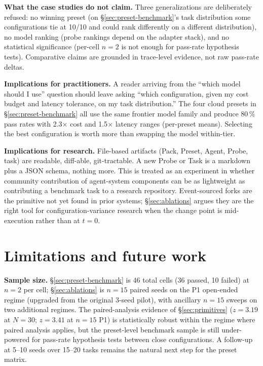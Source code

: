 \documentclass[11pt,a4paper]{article}
\begin{document}
\textbf{What the case studies do not claim.} Three
generalizations are deliberately refused: no winning preset (on
\S\ref{sec:preset-benchmark}'s task distribution some
configurations tie at 10/10 and could rank differently on a
different distribution), no model ranking (probe rankings depend
on the adapter stack), and no statistical significance (per-cell
$n = 2$ is not enough for pass-rate hypothesis tests).
Comparative claims are grounded in trace-level evidence, not raw
pass-rate deltas.

\textbf{Implications for practitioners.} A reader arriving from
the ``which model should I use'' question should leave asking
``which configuration, given my cost budget and latency tolerance,
on my task distribution.'' The four cloud presets in
\S\ref{sec:preset-benchmark} all use the same frontier model
family and produce 80\,\% pass rates with
2.3$\times$ cost and 1.5$\times$ latency ranges (per-preset means).
Selecting the best
configuration is worth more than swapping the model within-tier.

\textbf{Implications for research.} File-based artifacts
(Pack, Preset, Agent, Probe, task) are readable, diff-able,
git-tractable. A new Probe or Task is a markdown plus a JSON
schema, nothing more. This is treated as an experiment in
whether community contribution of agent-system components can be
as lightweight as contributing a benchmark task to a research
repository. Event-sourced forks are the primitive not yet
found in prior systems; \S\ref{sec:ablations} argues they are
the right tool for configuration-variance research when the
change point is mid-execution rather than at $t=0$.

\section{Limitations and future work}
\label{sec:limitations}

\textbf{Sample size.} \S\ref{sec:preset-benchmark} is 46 total
cells (36 passed, 10 failed) at $n = 2$ per cell;
\S\ref{sec:ablations} is $n=15$ paired seeds on the P1
open-ended regime (upgraded from the original 3-seed pilot),
with ancillary $n=15$ sweeps on two additional regimes. The
paired-analysis evidence of \S\ref{sec:primitives}
($z=3.19$ at $N=30$; $z=3.41$ at $n=15$ P1) is statistically
robust within the regime where paired analysis applies, but
the preset-level benchmark sample is still under-powered for
pass-rate hypothesis tests between close configurations. A
follow-up at 5--10 seeds over 15--20 tasks remains the natural
next step for the preset matrix.
\end{document}
